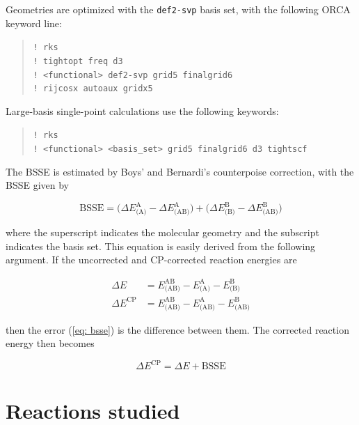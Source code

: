 \documentclass[11pt,a4paper]{article}
\begin{document}
Geometries are optimized with the \verb|def2-svp| basis set, with the following ORCA keyword line:

\begin{quote}
	\verb|! rks| \\
	\verb|! tightopt freq d3| \\
	\verb|! <functional> def2-svp grid5 finalgrid6| \\ 
	\verb|! rijcosx autoaux gridx5|
\end{quote}

Large-basis single-point calculations use the following keywords:

\begin{quote}
	\verb|! rks| \\
	\verb|! <functional> <basis_set> grid5 finalgrid6 d3 tightscf|
\end{quote}

The BSSE is estimated by Boys' and Bernardi's counterpoise correction, with the BSSE given by

\begin{equation} \label{eq: bsse}
\text{BSSE} = \Big(\Delta E^{\text{A}}_{\text{(A)}} - \Delta E^{\text{A}}_{\text{(AB)}} \Big) + \Big( \Delta E^{\text{B}}_{\text{(B)}} - \Delta E^{\text{B}}_{\text{(AB)}}\Big )			
\end{equation}

where the superscript indicates the molecular geometry and the subscript indicates the basis set.
This equation is easily derived from the following argument.
If the uncorrected and CP-corrected reaction energies are

\begin{align} \label{eq: rxn uncorrected}
\Delta E &= E^{\text{AB}}_{\text{(AB)}} - E^{\text{A}}_{\text{(A)}} - E^{\text{B}}_{\text{(B)}} \\ \label{eq: rxn corrected}
\Delta E^{\text{CP}} &= E^{\text{AB}}_{\text{(AB)}} - E^{\text{A}}_{\text{(AB)}} - E^{\text{B}}_{\text{(AB)}}
\end{align}

then the error (\cref{eq: bsse}) is the difference between them.
The corrected reaction energy then becomes

\begin{equation} \label{eq: }
\Delta E^{\text{CP}} = \Delta E + \text{BSSE}
\end{equation}

\section{Reactions studied}
\end{document}
